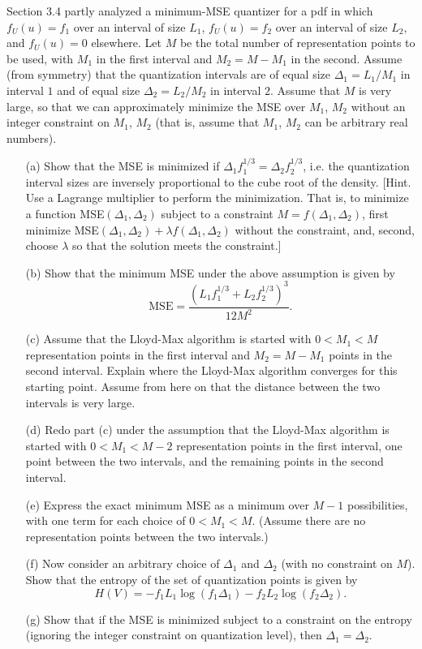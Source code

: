 \documentclass{assignment}
\begin{document}
\begin{prob}[3.4]
    Section 3.4 partly analyzed a minimum-MSE quantizer for a pdf in which $f_U(u)=f_1$ over an interval of size $L_1$, $f_U(u)=f_2$ over an interval of size $L_2$, and $f_U(u)=0$ elsewhere. Let $M$ be the total number of representation points to be used, with $M_1$ in the first interval and $M_2=M-M_1$ in the second. Assume (from symmetry) that the quantization intervals are of equal size $\Delta_1=L_1/M_1$ in interval $1$ and of equal size $\Delta_2=L_2/M_2$ in interval $2$. Assume that $M$ is very large, so that we can approximately minimize the MSE over $M_1$, $M_2$ without an integer constraint on $M_1$, $M_2$ (that is, assume that $M_1$, $M_2$ can be arbitrary real numbers).
    \begin{itemize}
        \item[(a)] Show that the MSE is minimized if $\Delta_1f_1^{1/3}=\Delta_2f_2^{1/3}$, i.e. the quantization interval sizes are inversely proportional to the cube root of the density. [Hint. Use a Lagrange multiplier to perform the minimization. That is, to minimize a function MSE$(\Delta_1,\Delta_2)$ subject to a constraint $M=f(\Delta_1,\Delta_2)$, first minimize MSE$(\Delta_1,\Delta_2)+\lambda f(\Delta_1,\Delta_2)$ without the constraint, and, second, choose $\lambda$ so that the solution meets the constraint.]
        \item[(b)] Show that the minimum MSE under the above assumption is given by
        \[
            \text{MSE}=\frac{(L_1f_1^{1/3}+L_2f_2^{1/3})^3}{12M^2}.
        \]
        \item[(c)] Assume that the Lloyd-Max algorithm is started with $0<M_1<M$ representation points in the first interval and $M_2=M-M_1$ points in the second interval. Explain where the Lloyd-Max algorithm converges for this starting point. Assume from here on that the distance between the two intervals is very large.
        \item[(d)] Redo part (c) under the assumption that the Lloyd-Max algorithm is started with $0<M_1<M-2$ representation points in the first interval, one point between the two intervals, and the remaining points in the second interval.
        \item[(e)] Express the exact minimum MSE as a minimum over $M-1$ possibilities, with one term for each choice of $0<M_1<M$. (Assume there are no representation points between the two intervals.)
        \item[(f)] Now consider an arbitrary choice of $\Delta_1$ and $\Delta_2$ (with no constraint on $M$). Show that the entropy of the set of quantization points is given by
        \[
            H(V)=-f_1L_1\log(f_1\Delta_1)-f_2L_2\log(f_2\Delta_2).
        \]
        \item[(g)] Show that if the MSE is minimized subject to a constraint on the entropy (ignoring the integer constraint on quantization level), then $\Delta_1=\Delta_2$.
    \end{itemize}
\end{prob}
\end{document}
